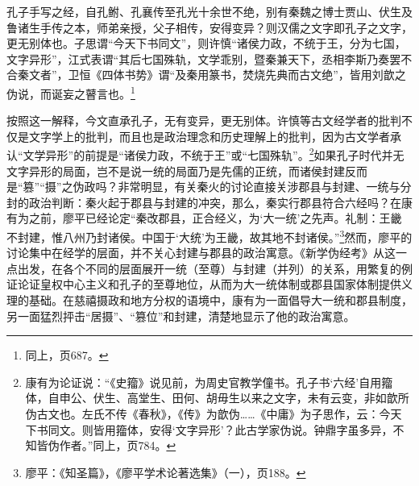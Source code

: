 \documentclass[a4paper, 12pt, openright]{ctexbook}
\renewenvironment{quote}
  {\list{}{\rightmargin2\ccwd \leftmargin2\ccwd \itemindent=2\ccwd \listparindent=2\ccwd}%
   \item\relax\small\kaishu\color{black}}
  {\endlist}
\begin{document}
\begin{quote}
孔子手写之经，自孔鲋、孔襄传至孔光十余世不绝，别有秦魏之博士贾山、伏生及鲁诸生手传之本，师弟亲授，父子相传，安得变异？则汉儒之文字即孔子之文字，更无别体也。子思谓“今天下书同文”，则许慎“诸侯力政，不统于王，分为七国，文字异形”，江式表谓“其后七国殊轨，文学乖别，暨秦兼天下，丞相李斯乃奏罢不合秦文者”，卫恒《四体书势》谓“及秦用篆书，焚烧先典而古文绝”，皆用刘歆之伪说，而诞妄之瞽言也。\footnote{同上，页687。}
\end{quote}

按照这一解释，今文直承孔子，无有变异，更无别体。许慎等古文经学者的批判不仅是文字学上的批判，而且也是政治理念和历史理解上的批判，因为古文学者承认“文学异形”的前提是“诸侯力政，不统于王”或“七国殊轨”。\footnote{康有为论证说：“《史籀》说见前，为周史官教学僮书。孔子书‘六经’自用籀体，自申公、伏生、高堂生、田何、胡毋生以来之文字，未有云变，非如歆所伪古文也。左氏不传《春秋》，《传》为歆伪……《中庸》为子思作，云：今天下书同文。则皆用籀体，安得‘文字异形’？此古学家伪说。钟鼎字虽多异，不知皆伪作者。”同上，页784。}如果孔子时代并无文字异形的局面，岂不是说一统的局面乃是先儒的正统，而诸侯封建反而是“篡”“摄”之伪政吗？非常明显，有关秦火的讨论直接关涉郡县与封建、一统与分封的政治判断：秦火起于郡县与封建的冲突，那么，秦实行郡县符合六经吗？在康有为之前，廖平已经论定“秦改郡县，正合经义，为‘大一统’之先声。礼制：王畿不封建，惟八州乃封诸侯。中国于‘大统’为王畿，故其地不封诸侯。”\footnote{廖平：《知圣篇》，《廖平学术论著选集》（一），页188。}然而，廖平的讨论集中在经学的层面，并不关心封建与郡县的政治寓意。《新学伪经考》从这一点出发，在各个不同的层面展开一统（至尊）与封建（并列）的关系，用繁复的例证论证皇权中心主义和孔子的至尊地位，从而为大一统体制或郡县国家体制提供义理的基础。在慈禧摄政和地方分权的语境中，康有为一面倡导大一统和郡县制度，另一面猛烈抨击“居摄”、“篡位”和封建，清楚地显示了他的政治寓意。
\end{document}
